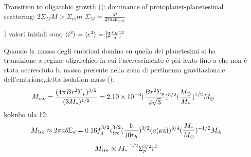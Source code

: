 
\begin{workout}
	Transition to oligarchic growth (\cite{thommes2003oligarchic}): dominance of protoplanet-planetesimal scattering: $2\Sigma_MM>\Sigma_mm$ $\Sigma_M=\frac{M}{2\pi a\Delta a_{stir}}$
\end{workout}

\begin{errata}
	I valori iniziali sono $\langle i^2 \rangle=\langle e^2 \rangle=[2\frac{r_H}{a}]^2$
\end{errata}

\begin{workout}

\end{workout}

\begin{workout}
	Quando la massa degli embrioni domina su quella dei planetesimi si ha transizione a regime oligarchico in cui l'accrescimento \'e pi\'u lento fino a che non \'e stata accresciuta la massa presente nella zona di pertinenza gravitazionale dell'embrione,detta isolation mass (\cite{lissauer1993planet}):
	\begin{align}
		&M_{iso}=\frac{(4\pi Br^2\Sigma_p)^{3/2}}{(3M_*)^{1/2}}=\num{2.10e-3}(\frac{Br^2\Sigma_p}{2\sqrt{3}})^{3/2}(\frac{M_{\odot}{}}{M_*})^{1/2}M_{\oplus}{}
	\end{align}
	kokubo ida 12:
	\[M_{iso}\approx2\pi ab\Sigma_d=0.16f_d\expy{3/2}\epsilon_{ice}\expy{3/2}(\frac{b}{10r_h})\expy{3/2}(a(\si{\astronomicalunit}))\expy{3/4}(\frac{M_*}{\msun{}})\expy{-1/2}\mearth{}\]
	\begin{equation}
	M_{iso}\propto M_*^{-1/2}\Sigma_p^{3/2}r^3
	\end{equation}
\end{workout}

